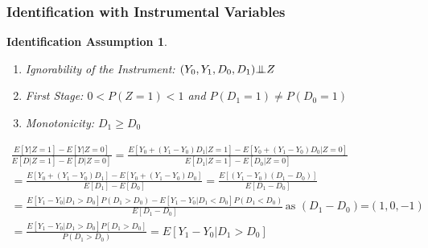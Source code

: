 \documentclass[xcolor=dvipsnames]{beamer}
\newtheorem{iass}{Identification Assumption}
\newcommand{\indep}{{\bot\negthickspace\negthickspace\bot}}
\begin{document}
\begin{frame}
  \frametitle{Identification with Instrumental Variables}
\begin{iass}
\begin{enumerate}
  \item Ignorability of the Instrument: $(Y_{0},Y_{1}, D_{0},D_{1}) \indep Z$
  \item First Stage: $0 < P(Z=1) < 1$ and
  $P(D_{1}=1) \neq P(D_{0}=1)$
  \item Monotonicity: $D_{1} \geq D_{0}$
  \end{enumerate}
\end{iass}\vspace{-.2in}
\scriptsize
\begin{Proof}
\begin{multline*}
\frac{E[Y|Z=1]-E[Y|Z=0]}{E[D|Z=1]-E[D|Z=0]}= \frac{E[Y_0 + (Y_1-Y_0) D_1|Z=1]-E[Y_0 + (Y_1-Y_0) D_0|Z=0]}{E[D_1|Z=1]-E[D_0|Z=0]}\\
= \frac{E[Y_0 + (Y_1-Y_0) D_1] - E[Y_0 + (Y_1-Y_0) D_0]}{E[D_1]-E[D_0]}=\frac{E[(Y_1-Y_0)(D_1-D_0)]}{E[D_1-D_0]} \\
= \frac{E[Y_1-Y_0|D_1>D_0]P(D_1>D_0)-E[Y_1-Y_0|D_1<D_0]P(D_1<D_0)}{E[D_1-D_0]} \,\mbox{as $(D_1-D_0)$=$(1,0,-1)$}\\
= \frac{E[Y_1-Y_0|D_1>D_0]P[D_1>D_0]}{P(D_1>D_0)}=E[Y_1-Y_0|D_1>D_0]
\end{multline*}
\end{Proof}
\end{frame}
\end{document}
